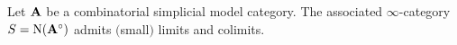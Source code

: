 

\begin{corollary}\label{limitsinmodel}
Let ${\mathbf A}$ be a combinatorial simplicial model category. The associated $\infty$-category
$S = \operatorname{N}( {\mathbf A}^{\circ})$ admits $($small$)$ limits and colimits.
\end{corollary}

